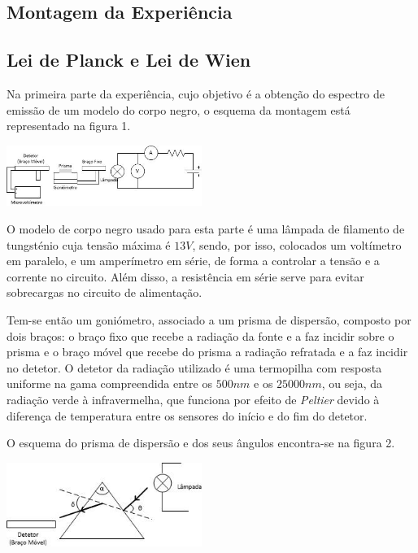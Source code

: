 \documentclass[9pt]{extarticle}
\begin{document}
\begin{multicols}{2}
\section{Montagem da Experiência}
\subsection{Lei de Planck e Lei de Wien}
\par Na primeira parte da experiência, cujo objetivo é a obtenção do espectro de emissão de um modelo do corpo negro, o esquema da montagem está representado na figura 1.

\begin{center}
\includegraphics[width=180pt]{parte1.jpg}
\begin{center}
\par{}
\end{center}
\end{center}

\par O modelo de corpo negro usado para esta parte é uma lâmpada de filamento de tungsténio cuja tensão máxima é $13 V$, sendo, por isso, colocados um voltímetro em paralelo, e um amperímetro em série, de forma a controlar a tensão e a corrente no circuito. Além disso, a resistência em série serve para evitar sobrecargas no circuito de alimentação.

\par Tem-se então um goniómetro, associado a um prisma de dispersão, composto por dois braços: o braço fixo que recebe a radiação da fonte e a faz incidir sobre o prisma e o braço móvel que recebe do prisma a radiação refratada e a faz incidir no detetor. O detetor da radiação utilizado é uma termopilha com resposta uniforme na gama compreendida entre os $500 nm$ e os $25000 nm$, ou seja, da radiação verde à infravermelha, que funciona por efeito de \textit{Peltier} devido à diferença de temperatura entre os sensores do início e do fim do detetor.
\par O esquema do prisma de dispersão e dos seus ângulos encontra-se na figura 2.

\begin{center}
\includegraphics[width=180pt]{prisma.jpg}
\begin{center}
\par{}
\end{center}
\end{center}


\end{multicols}
\end{document}
